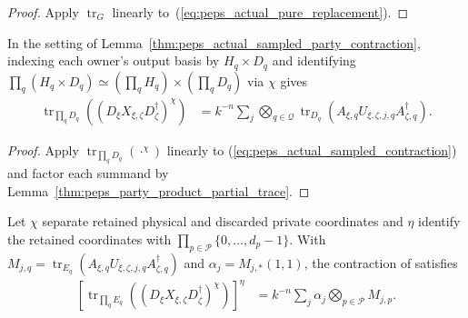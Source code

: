 \begin{proof}\leanok
    Apply $\operatorname{tr}_G$ linearly to~(\ref{eq:peps_actual_pure_replacement}).
\end{proof}


\begin{lemma}
    \label{thm:peps_actual_sampled_local_output_trace}
    \leanok
    In the setting of Lemma~\ref{thm:peps_actual_sampled_party_contraction},
    indexing each owner's output basis by $H_q\times D_q$ and identifying
    $\prod_q(H_q\times D_q)\simeq(\prod_qH_q)\times(\prod_qD_q)$ via $\chi$ gives
    \begin{align}
        \operatorname{tr}_{\prod_qD_q}
        \left((D_\xi X_{\xi,\zeta}D_\zeta^\dagger)^\chi\right)
         & =k^{-n}\sum_j\bigotimes_{q\in\mathcal Q}
        \operatorname{tr}_{D_q}
        \left(A_{\xi,q}U_{\xi,\zeta,j,q}A_{\zeta,q}^\dagger\right).
        \label{eq:peps_actual_sampled_local_trace}
    \end{align}
\end{lemma}

\begin{proof}
    \leanok
    Apply $\operatorname{tr}_{\prod_qD_q}(\cdot^\chi)$ linearly to
    (\ref{eq:peps_actual_sampled_contraction}) and factor each summand by
    Lemma~\ref{thm:peps_party_product_partial_trace}.
\end{proof}

\begin{lemma}
    \label{thm:peps_actual_sampled_physical_factors}
    \leanok
    Let $\chi$ separate retained physical and discarded private coordinates and
    $\eta$ identify the retained coordinates with
    $\prod_{p\in\mathcal P}\{0,\ldots,d_p-1\}$. With
    $M_{j,q}=\operatorname{tr}_{E_q}(A_{\xi,q}U_{\xi,\zeta,j,q}A_{\zeta,q}^\dagger)$
    and $\alpha_j=M_{j,*}(1,1)$, the contraction of
    \cite[proof of Theorem~5.2]{OpenAI2026PolynomialPEPS} satisfies
    \begin{align}
        \left[\operatorname{tr}_{\prod_qE_q}
            \left((D_\xi X_{\xi,\zeta}D_\zeta^\dagger)^\chi\right)\right]^\eta
         & =k^{-n}\sum_j\alpha_j
        \bigotimes_{p\in\mathcal P}M_{j,p}.
        \label{eq:peps_actual_sampled_physical_factors}
    \end{align}
\end{lemma}

